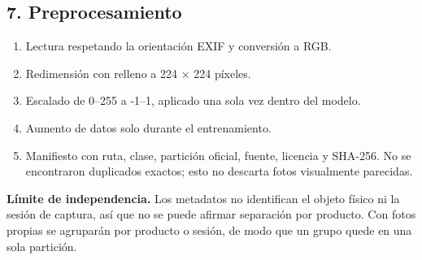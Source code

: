 \documentclass[11pt,a4paper]{article}
\begin{document}
\subsection*{7. Preprocesamiento}
\begin{enumerate}[nosep]
\item Lectura respetando la orientación EXIF y conversión a RGB.
\item Redimensión con relleno a 224 $\times$ 224 píxeles.
\item Escalado de 0--255 a -1--1, aplicado una sola vez dentro del modelo.
\item Aumento de datos solo durante el entrenamiento.
\item Manifiesto con ruta, clase, partición oficial, fuente, licencia y SHA-256. No se encontraron duplicados exactos; esto no descarta fotos visualmente parecidas.
\end{enumerate}
\noindent \textbf{Límite de independencia.} Los metadatos no identifican el objeto físico ni la sesión de captura, así que no se puede afirmar separación por producto. Con fotos propias se agruparán por producto o sesión, de modo que un grupo quede en una sola partición.\par
\end{document}
